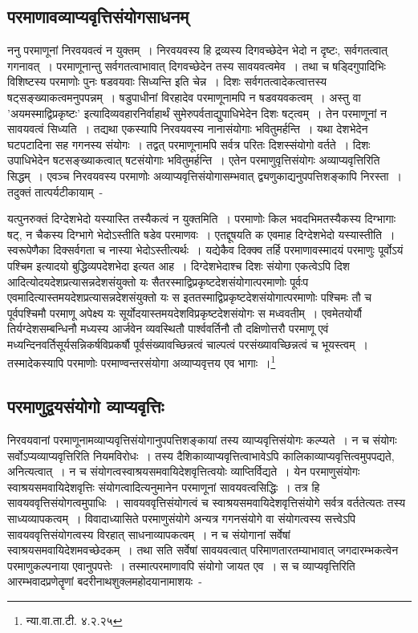 		\subsection{परमाणावव्याप्यवृत्तिसंयोगसाधनम्}

		 ननु परमाणूनां निरवयवत्वं न युक्तम्~। निरवयवस्य हि द्रव्यस्य दिगवच्छेदेन भेदो न दृष्टः, सर्वगतत्वात् गगनावत्~। परमाणूनान्तु सर्वगतत्वाभावात् दिगवच्छेदेन तस्य सावयवत्वमेव~। तथा च षड्दिगुपादिभिः विशिष्टस्य परमाणोः पुनः षडवयवाः सिध्यन्ति इति चेन्न~। दिशः सर्वगतत्वादेकत्वात्तस्य षट्सङ्ख्याकत्वमनुपपन्नम्~। षडुपाधीनां विरहादेव परमाणूनामपि न षडवयवकत्वम्~। अस्तु वा 'अयमस्माद्विप्रकृष्टः' इत्यादिव्यवहारनिर्वाहार्थं सुमेरुपर्वताद्युपाधिभेदेन दिशः षट्त्वम्~। तेन परमाणूनां न सावयवत्वं सिध्यति~। तद्यथा एकस्यापि निरवयवस्य नानासंयोगाः भवितुमर्हन्ति~। यथा देशभेदेन घटपटादिना सह गगनस्य संयोगः~। तद्वत् परमाणूनामपि सर्वत्र परितः दिशस्संयोगो वर्तते~। दिशः उपाधिभेदेन षटसङ्ख्याकत्वात् षटसंयोगाः भवितुमर्हन्ति~। एतेन परमाणुवृत्तिसंयोगः अव्याप्यवृत्तिरिति सिद्धम्~। एवञ्च निरवयवस्य परमाणोः अव्याप्यवृत्तिसंयोगासम्भवात् द्व्यणुकाद्यनुपपत्तिशङ्कापि निरस्ता~। तदुक्तं तात्पर्यटीकायाम्~-

		{\fontsize{11.7}{0}\selectfont\s यत्पुनरुक्तं दिग्देशभेदो यस्यास्ति तस्यैकत्वं न युक्तमिति~। परमाणोः किल भवदभिमतस्यैकस्य दिग्भागाः षट्, न चैकस्य दिग्भागे भेदोऽस्तीति षडेव परमाणवः~। एतद्दूषयति क एवमाह दिग्देशभेदो यस्यास्तीति~। स्वरूपेणैका दिक्सर्वगता च नास्या भेदोऽस्तीत्यर्थः~। यद्येकैव दिक्क्व तर्हि परमाणावस्मादयं परमाणुः पूर्वोऽयं पश्चिम इत्यादयो बुद्धिव्यपदेशभेदा इत्यत आह~। दिग्देशभेदाश्च दिशः संयोगा एकत्वेऽपि दिश आदित्योदयदेशप्रत्यासन्नदेशसंयुक्तो यः सैतरस्माद्विप्रकृष्टदेशसंयोगात्परमाणोः पूर्वःप एवमादित्यास्तमयदेशप्रत्यासन्नदेशसंयुक्तो यः स इततस्माद्विप्रकृष्टदेशसंयोगात्परमाणोः पश्चिमः तौ च पूर्वपश्चिमौ परमाणू अपेक्ष्य यः सूर्योदयास्तमयदेशविप्रकृष्टदेशसंयोगः स मध्ववतीम्~। एवमेतयोर्यौ तिर्यग्देशसम्बन्धिनौ मध्यस्य आर्जवेन व्यवस्थितौ पार्श्ववर्तिनौ तौ दक्षिणोत्तरौ परमाणू एवं मध्यन्दिनवर्तिसूर्यसन्निकर्षविप्रकर्षौ पूर्वसंख्यावच्छिन्नत्वं चाल्पत्वं परसंख्यावच्छिन्नत्वं च भूयस्त्वम्~। तस्मादेकस्यापि परमाणोः परमाण्वन्तरसंयोगा अव्याप्यवृत्तय एव भागाः~।\footnote{न्या.वा.ता.टी. ४.२.२५}}

		\subsection{परमाणुद्वयसंयोगो व्याप्यवृत्तिः}

		निरवयवानां परमाणूनामव्याप्यवृत्तिसंयोगानुपपत्तिशङ्कायां तस्य व्याप्यवृत्तिसंयोगः कल्प्यते~। न च संयोगः सर्वोऽप्यव्याप्यवृत्तिरिति नियमविरोधः~। तस्य दैशिकाव्याप्यवृत्तित्वाभावेऽपि कालिकाव्याप्यवृत्तित्वमुपपद्यते, अनित्यत्वात्~। न च संयोगत्वस्वाश्रयसमवायिदेशवृत्तित्वयोः व्याप्तिर्विद्यते~। येन परमाणुसंयोगः स्वाश्रयसमवायिदेशवृत्तिः संयोगत्वादित्यनुमानेन परमाणूनां सावयवत्वसिद्धिः~। तत्र हि सावयववृत्तिसंयोगत्वमुपाधिः~। सावयववृत्तिसंयोगत्वं च स्वाश्रयसमवायिदेशवृत्तिसंयोगे सर्वत्र वर्ततेत्यतः तस्य साध्यव्यापकत्वम्~। विवादाध्यासिते परमाणुसंयोगे अन्यत्र गगनसंयोगे वा संयोगत्वस्य सत्त्वेऽपि सावयववृत्तिसंयोगत्वस्य विरहात् साधनाव्यापकत्वम्~। न च संयोगानां सर्वेषां स्वाश्रयसमवायिदेशमवच्छेदकम्~। तथा सति सर्वेषां सावयवत्वात् परिमाणतारतम्याभावात् जगदारम्भकत्वेन परमाणुकल्पनाया एवानुपपत्तेः~। तस्मात्परमाणावपि संयोगो जायत एव~। स च व्याप्यवृत्तिरिति आरम्भवादप्रणेतॄणां बदरीनाथशुक्लमहोदयानामाशयः~- 


